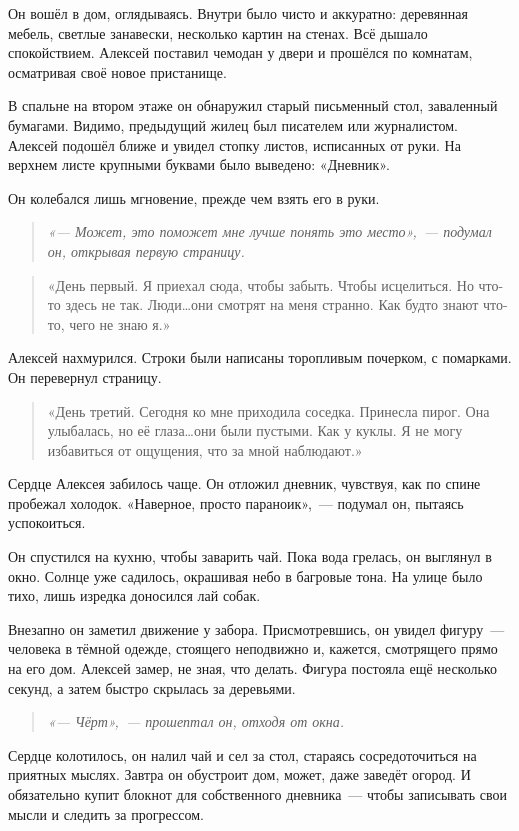 \documentclass[12pt,a4paper]{book}
\newenvironment{dialogue}{\begin{quote}\itshape}{\end{quote}} %
\begin{document}
Он вошёл в дом, оглядываясь. Внутри было чисто и аккуратно: деревянная мебель, светлые занавески, несколько картин на стенах. Всё дышало спокойствием. Алексей поставил чемодан у двери и прошёлся по комнатам, осматривая своё новое пристанище.

В спальне на втором этаже он обнаружил старый письменный стол, заваленный бумагами. Видимо, предыдущий жилец был писателем или журналистом. Алексей подошёл ближе и увидел стопку листов, исписанных от руки. На верхнем листе крупными буквами было выведено: «Дневник».

Он колебался лишь мгновение, прежде чем взять его в руки.
\begin{dialogue}
«--- Может, это поможет мне лучше понять это место»,~--- подумал он, открывая первую страницу.
\end{dialogue}

\begin{quote}
«День первый. Я приехал сюда, чтобы забыть. Чтобы исцелиться. Но что-то здесь не так. Люди\ldots они смотрят на меня странно. Как будто знают что-то, чего не знаю я.»
\end{quote}

Алексей нахмурился. Строки были написаны торопливым почерком, с помарками. Он перевернул страницу.
\begin{quote}
«День третий. Сегодня ко мне приходила соседка. Принесла пирог. Она улыбалась, но её глаза\ldots они были пустыми. Как у куклы. Я не могу избавиться от ощущения, что за мной наблюдают.»
\end{quote}

Сердце Алексея забилось чаще. Он отложил дневник, чувствуя, как по спине пробежал холодок. «Наверное, просто параноик»,~--- подумал он, пытаясь успокоиться.

Он спустился на кухню, чтобы заварить чай. Пока вода грелась, он выглянул в окно. Солнце уже садилось, окрашивая небо в багровые тона. На улице было тихо, лишь изредка доносился лай собак.

Внезапно он заметил движение у забора. Присмотревшись, он увидел фигуру~--- человека в тёмной одежде, стоящего неподвижно и, кажется, смотрящего прямо на его дом. Алексей замер, не зная, что делать. Фигура постояла ещё несколько секунд, а затем быстро скрылась за деревьями.

\begin{dialogue}
«--- Чёрт»,~--- прошептал он, отходя от окна.
\end{dialogue}

Сердце колотилось, он налил чай и сел за стол, стараясь сосредоточиться на приятных мыслях. Завтра он обустроит дом, может, даже заведёт огород. И обязательно купит блокнот для собственного дневника~--- чтобы записывать свои мысли и следить за прогрессом.
\end{document}
